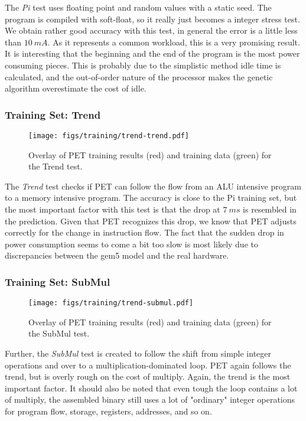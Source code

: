 The \emph{Pi} test uses floating point and random values with a static seed. The
program is compiled with soft-float, so it really just becomes a integer stress
test. We obtain rather good accuracy with this test, in general the error is a
little less than $10~mA$. As it represents a common workload, this is a very
promising result. It is interesting that the beginning and the end of the
program is the most power consuming pieces. This is probably due to the
simplistic method idle time is calculated, and the out-of-order nature of the
processor makes the genetic algorithm overestimate the cost of idle.

\subsubsection{Training Set: Trend}
\begin{figure}[htb]
    \centering
    \texttt{[image: figs/training/trend-trend.pdf]}
    \caption{Overlay of PET training results (red) and training data (green) for the Trend test.}
    \label{fig:trend-training}
\end{figure}

The \emph{Trend} test checks if PET can follow the flow from an ALU intensive
program to a memory intensive program. The accuracy is close to the Pi training
set, but the most important factor with this test is that the drop at $7~ms$ is
resembled in the prediction. Given that PET recognizes this drop, we know that
PET adjusts correctly for the change in instruction flow. The fact that the
sudden drop in power consumption seems to come a bit too slow is most likely due
to discrepancies between the gem5 model and the real hardware.

\newpage

\subsubsection{Training Set: SubMul}
\begin{figure}[htb]
    \centering
    \texttt{[image: figs/training/trend-submul.pdf]}
    \caption{Overlay of PET training results (red) and training data (green) for the SubMul test.}
    \label{fig:submul-training}
\end{figure}

Further, the \emph{SubMul} test is created to follow the shift from simple
integer operations and over to a multiplication-dominated loop. PET again
follows the trend, but is overly rough on the cost of multiply. Again, the trend
is the most important factor. It should also be noted that even tough the loop
contains a lot of multiply, the assembled binary still uses a lot of "ordinary"
integer operations for program flow, storage, registers, addresses, and so on.

